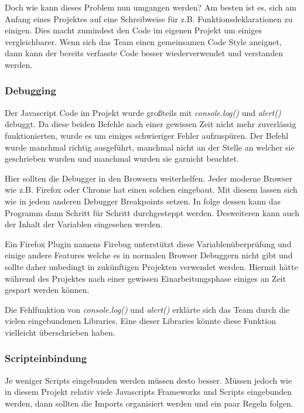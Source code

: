 Doch wie kann dieses Problem nun umgangen werden? Am besten ist es, sich am Anfang eines Projektes auf eine Schreibweise für z.B. Funktionsdeklarationen zu einigen. Dies macht zumindest den Code im eigenen Projekt um einiges vergleichbarer. Wenn sich das Team einen gemeinsamen Code Style aneignet, dann kann der bereits verfasste Code besser wiederverwendet und verstanden werden.

\subsubsection{Debugging}
Der Javascript Code im Projekt wurde großteils mit \textit{console.log()} und \textit{alert()} debuggt. Da diese beiden Befehle nach einer gewissen Zeit nicht mehr zuverlässig funktionierten, wurde es um einiges schwieriger Fehler aufzuspüren. Der Befehl wurde manchmal richtig ausgeführt, manchmal nicht an der Stelle an welcher sie geschrieben wurden und manchmal wurden sie garnicht beachtet. 

Hier sollten die Debugger in den Browsern weiterhelfen. Jeder moderne Browser wie z.B. Firefox oder Chrome hat einen solchen eingebaut. Mit diesem lassen sich wie in jedem anderen Debugger Breakpoints setzen. In folge dessen kann das Programm dann Schritt für Schritt durchgesteppt werden. Desweiteren kann auch der Inhalt der Variablen eingesehen werden. 

Ein Firefox Plugin namens Firebug unterstützt diese Variablenüberprüfung und einige andere Features welche es in normalen Browser Debuggern nicht gibt und sollte daher unbedingt in zukünftigen Projekten verwendet werden. Hiermit hätte während des Projektes nach einer gewissen Einarbeitungsphase einiges an Zeit gespart werden können. 


Die Fehlfunktion von \textit{console.log()} und \textit{alert()} erklärte sich das Team durch die vielen eingebundenen Libraries. Eine dieser Libraries könnte diese Funktion vielleicht überschrieben haben.

\subsubsection{Scripteinbindung}
Je weniger Scripts eingebunden werden müssen desto besser. Müssen jedoch wie in diesem Projekt relativ viele Javascripts Frameworks und Scripts eingebunden werden, dann sollten die Imports organisiert werden und ein paar Regeln folgen.

